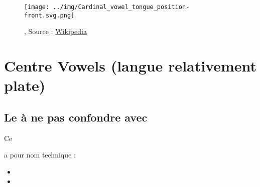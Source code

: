\begin{center}
  \begin{figure}[h]
    \centering
    \texttt{[image: ../img/Cardinal\_vowel\_tongue\_position-front.svg.png]}
    \caption[]{, Source : \href{https://en.wikipedia.org/wiki/Vowel\#Backness}{Wikipedia}}
    \label{fig:front-vowels-in-the-mouth}
  \end{figure}
\end{center}

\newpage
\minitoc
\newpage

\chapter{Centre Vowels (langue relativement plate)}\label{chap:centvow}


\newpage
\minitoc
\newpage

\section{Le \son {} à ne pas confondre avec \href{https://en.wikipedia.org/wiki/Open-mid_central_unrounded_vowel}{} }\label{sec:sonenv}

\notation

\hypertarget{sonenv}{Ce \son} a pour nom technique :

\begin{itemize}
\item {}
\item {}
\end{itemize}

\indicsound


